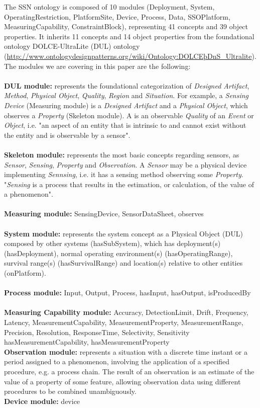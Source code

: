 \documentclass{sig-alternate-05-2015}
\begin{document}
The SSN ontology is composed of 10 modules (Deployment, System, OperatingRestriction, PlatformSite, Device, Process, Data, SSOPlatform, MeasuringCapability, ConstraintBlock), representing 41 concepts and 39 object properties. It inherits 11 concepts and 14 object properties from the foundational ontology DOLCE-UltraLite (DUL) ontology (\url{http://www.ontologydesignpatterns.org/wiki/Ontology:DOLCEþDnS_Ultralite}). The modules we are covering in this paper are the following:
\\\\\textbf{DUL module:} represents the foundational categorization of \textit{Designed Artifact}, \textit{Method}, \textit{Physical Object}, \textit{Quality}, \textit{Region} and \textit{Situation}. For example, a \textit{Sensing Device} (Measuring module) is a \textit{Designed Artifact} and a \textit{Physical Object}, which observes a \textit{Property} (Skeleton module). A  is an observable \textit{Quality} of an \textit{Event} or \textit{Object}, i.e. "an aspect of an entity that is intrinsic to and cannot exist without the entity and is observable by a sensor". 
\\\\\textbf{Skeleton module:} represents the most basic concepts regarding sensors, as \textit{Sensor}, \textit{Sensing}, \textit{Property} and  \textit{Observation}. A \textit{Sensor} may be a physical device implementing \textit{Sennsing}, i.e. it has a sensing method observing some \textit{Property}. "\textit{Sensing} is a process that results in the estimation, or calculation, of the value of a phenomenon". 
\\\\\textbf{Measuring module:} SensingDevice, SensorDataSheet, observes
\\\\\textbf{System module:} represents the system concept as a Physical Object (DUL) composed by other systems (hasSubSystem), which has deployment(s) (hasDeployment), normal operating environment(s) (hasOperatingRange), survival range(s) (hasSurvivalRange) and location(s) relative to other entities (onPlatform).
\\\\\textbf{Process module:} Input, Output, Process, hasInput, hasOutput, isProducedBy
\\\\\textbf{Measuring Capability module:} Accuracy, DetectionLimit, Drift, Frequency, Latency, MeasurementCapability, MeasurementProperty, MeasurementRange, Precision, Resolution, ResponseTime, Selectivity, Sensitivity	hasMeasurementCapability, hasMeasurementProperty
\\\textbf{Observation module:} represents a situation with a discrete time instant or a period assigned to a phenomenon, involving the application of a specified procedure, e.g. a process chain. The result of an observation is an estimate of the value of a property of some feature, allowing observation data using different procedures to be combined unambiguously. 
\\\textbf{Device module:} device
 
\end{document}
